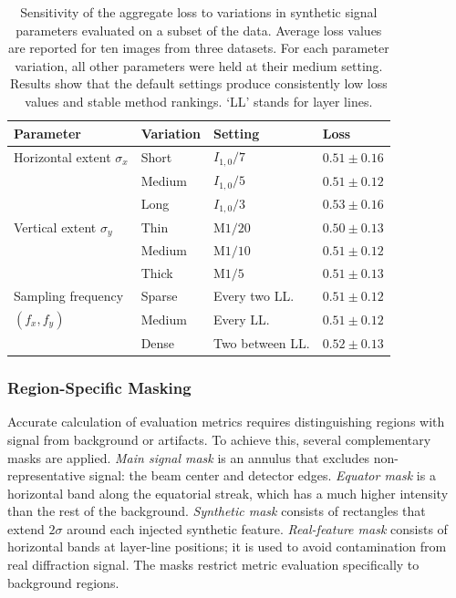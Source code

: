 \documentclass[journal,article,submit,moreauthors]{Definitions/mdpi}
\begin{document}
\begin{table}[h]
\caption{Sensitivity of the aggregate loss to variations in synthetic signal parameters evaluated on a subset of the data.
Average loss values are reported for ten images from three datasets.
For each parameter variation, all other parameters were held at their medium setting.
Results show that the default settings produce consistently low loss values and stable method rankings. `LL' stands for layer lines.}
\label{tab:variations}
\centering
\footnotesize
\setlength{\tabcolsep}{4pt}
\renewcommand{\arraystretch}{1.0}
\begin{tabular}{@{}llll@{}}
\toprule
\textbf{Parameter} & \textbf{Variation} & \textbf{Setting} & \textbf{Loss} \\ \midrule
Horizontal extent $\sigma_x$ & Short & $I_{1,0}/7$ & $0.51 \pm 0.16$ \\
& Medium & $I_{1,0}/5$ & $0.51 \pm 0.12$ \\
& Long & $I_{1,0}/3$ & $0.53 \pm 0.16$ \\ \midrule
Vertical extent $\sigma_y$ & Thin & $\mathrm{M1}/20$ & $0.50 \pm 0.13$ \\
& Medium & $\mathrm{M1}/10$ & $0.51 \pm 0.12$ \\
& Thick & $\mathrm{M1}/5$ & $0.51 \pm 0.13$  \\ \midrule
Sampling frequency & Sparse & Every two LL. & $0.51 \pm 0.12$ \\
$(f_x, f_y)$ & Medium & Every LL. & $0.51 \pm 0.12$ \\
& Dense & Two between LL. & $0.52 \pm 0.13$ \\
\bottomrule
\end{tabular}
\end{table}

\subsubsection{Region-Specific Masking}
\label{sec:masking}
Accurate calculation of evaluation metrics requires distinguishing regions with signal from background or artifacts. To achieve this, several complementary masks are applied. \textit{Main signal mask} is an annulus that excludes non-representative signal: the beam center and detector edges. \textit{Equator mask} is a horizontal band along the equatorial streak, which has a much higher intensity than the rest of the background. \textit{Synthetic mask} consists of rectangles that extend $2\sigma$ around each injected synthetic feature. \textit{Real-feature mask} consists of horizontal bands at layer-line positions; it is used to avoid contamination from real diffraction signal. The masks restrict metric evaluation specifically to background regions.
\end{document}
